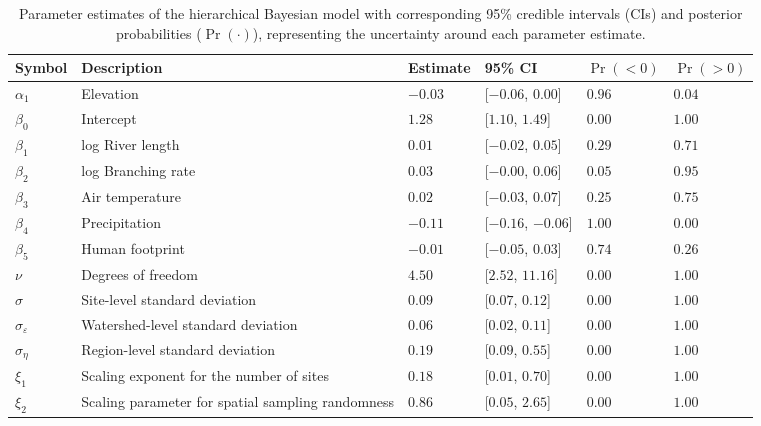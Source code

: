 \begin{table}[ht]
\centering
\caption{Parameter estimates of the hierarchical Bayesian model 
             with corresponding 95\% credible intervals (CIs) and 
             posterior probabilities ($\Pr(\cdot)$), 
             representing the uncertainty around each parameter estimate.
             \label{tab:parms-est}} 
\begingroup\small
\begin{tabularx}{\textwidth}{llllll}
  \hline
Symbol & Description & Estimate & 95\% CI & $\Pr(< 0)$ & $\Pr(> 0)$ \\ 
  \hline
$\alpha_1$ & Elevation & $-0.03$ & [$-0.06$, $0.00$] & $0.96$ & $0.04$ \\ 
  $\beta_0$ & Intercept & $1.28$ & [$1.10$, $1.49$] & $0.00$ & $1.00$ \\ 
  $\beta_1$ & log River length & $0.01$ & [$-0.02$, $0.05$] & $0.29$ & $0.71$ \\ 
  $\beta_2$ & log Branching rate & $0.03$ & [$-0.00$, $0.06$] & $0.05$ & $0.95$ \\ 
  $\beta_3$ & Air temperature & $0.02$ & [$-0.03$, $0.07$] & $0.25$ & $0.75$ \\ 
  $\beta_4$ & Precipitation & $-0.11$ & [$-0.16$, $-0.06$] & $1.00$ & $0.00$ \\ 
  $\beta_5$ & Human footprint & $-0.01$ & [$-0.05$, $0.03$] & $0.74$ & $0.26$ \\ 
  $\nu$ & Degrees of freedom & $4.50$ & [$2.52$, $11.16$] & $0.00$ & $1.00$ \\ 
  $\sigma$ & Site-level standard deviation & $0.09$ & [$0.07$, $0.12$] & $0.00$ & $1.00$ \\ 
  $\sigma_{\varepsilon}$ & Watershed-level standard deviation & $0.06$ & [$0.02$, $0.11$] & $0.00$ & $1.00$ \\ 
  $\sigma_{\eta}$ & Region-level standard deviation & $0.19$ & [$0.09$, $0.55$] & $0.00$ & $1.00$ \\ 
  $\xi_{1}$ & Scaling exponent for the number of sites & $0.18$ & [$0.01$, $0.70$] & $0.00$ & $1.00$ \\ 
  $\xi_{2}$ & Scaling parameter for spatial sampling randomness & $0.86$ & [$0.05$, $2.65$] & $0.00$ & $1.00$ \\ 
   \hline
\end{tabularx}
\endgroup
\end{table}

